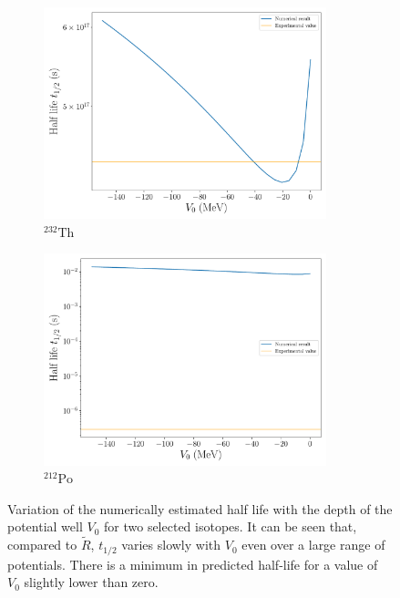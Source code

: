 \documentclass[a4paper,DIV=12,english]{scrartcl}
\begin{document}
\begin{figure}
    \centering
    \begin{subfigure}{0.49\textwidth}
        \centering
        \includegraphics[width=0.9\textwidth]{../plots/V0_dependence/V0_th232.pdf}
        \caption{$^{232}\text{Th}$}
        \label{subfig:v0_th232}
    \end{subfigure}
    \begin{subfigure}{0.49\textwidth}
        \centering
        \includegraphics[width=0.9\textwidth]{../plots/V0_dependence/V0_po212.pdf}
        \caption{$^{212}\text{Po}$}
        \label{subfig:v0_po212}
    \end{subfigure}
    \caption{Variation of the numerically estimated half life with the depth of the potential well $V_0$ for two selected isotopes. It can be seen that, compared to $\tilde R$, $t_{1/2}$ varies slowly with $V_0$ even over a large range of potentials. There is a minimum in predicted half-life for a value of $V_0$ slightly lower than zero. }
    \label{fig:v0}
\end{figure}
\end{document}
